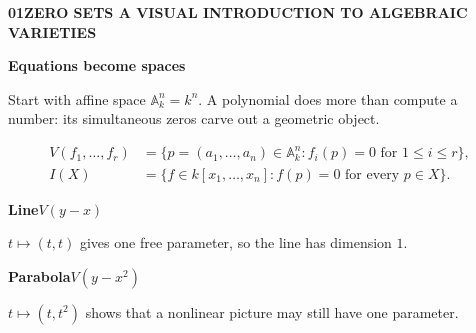 \documentclass[9pt,a4paper]{extarticle}
\newcommand{\A}{\mathbb{A}}
\newcommand{\kk}{k}
\newcommand{\footertext}{ALGEBRAIC VARIETIES}
\newcommand{\pagehead}[3]{%
  {\fontsize{7.2}{8}\selectfont\bfseries\color{teal}#1\quad #2\hfill
   \normalfont\color{muted}A VISUAL INTRODUCTION TO ALGEBRAIC VARIETIES}\par
  \vspace{2.5pt}{\color{line}\hrule height 0.45pt}\vspace{8pt}
  {\fontsize{21}{23}\selectfont\bfseries\color{navy}#3}\par\vspace{5pt}}
\newcommand{\lead}[1]{{\fontsize{11.2}{15.2}\selectfont #1\par}\vspace{6pt}}
\begin{document}
\renewcommand{\footertext}{ZERO SETS / AFFINE SPACE / THE BASE FIELD}
\pagehead{01}{ZERO SETS}{Equations become spaces}
\lead{Start with affine space $\A^n_{\kk}=\kk^n$. A polynomial does more than compute a number: its simultaneous zeros carve out a geometric object.}

\begin{mathbox}
\begin{align*}
V(f_1,\ldots,f_r)
  &=\bigl\{p=(a_1,\ldots,a_n)\in\A^n_{\kk}:f_i(p)=0\text{ for }1\le i\le r\bigr\},\\
I(X)
  &=\bigl\{f\in\kk[x_1,\ldots,x_n]:f(p)=0\text{ for every }p\in X\bigr\}.
\end{align*}
\end{mathbox}

\vspace{4pt}
\begin{minipage}[t]{.316\textwidth}
\begin{quietbox}
\textbf{Line}\hfill $V(y-x)$\par\vspace{2pt}
\begin{center}
\end{center}
$t\mapsto(t,t)$ gives one free parameter, so the line has dimension $1$.
\end{quietbox}
\end{minipage}\hfill
\begin{minipage}[t]{.316\textwidth}
\begin{quietbox}
\textbf{Parabola}\hfill $V(y-x^2)$\par\vspace{2pt}
\begin{center}
\end{center}
$t\mapsto(t,t^2)$ shows that a nonlinear picture may still have one parameter.
\end{quietbox}
\end{minipage}\hfill
\end{document}
